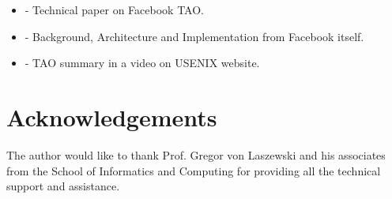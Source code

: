 \documentclass[9pt,twocolumn,twoside]{../../styles/osajnl}
\begin{document}
\begin{itemize}
\item \cite{book-tao1} - Technical paper on Facebook TAO.

\item \cite{www-tao2} - Background, Architecture and Implementation from Facebook itself.

\item \cite{www-tao3} - TAO summary in a video on USENIX website.

\end{itemize}


\section {Acknowledgements}
The author would like to thank Prof. Gregor von Laszewski and his associates from the School of Informatics and Computing for providing all the technical support and assistance.



\end{document}
